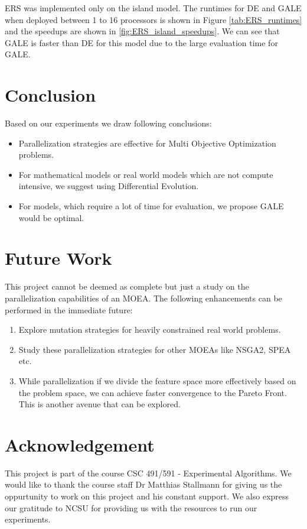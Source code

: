 \documentclass[conference]{IEEEtran}
\begin{document}
	
	
	
	ERS was implemented only on the island model. The runtimes for DE and GALE when deployed between 1 to 16 processors is shown in Figure \ref{tab:ERS_runtimes} and the speedups are shown in \ref{fig:ERS_island_speedups}. We can see that GALE is faster than DE for this model due to the large evaluation time for GALE.
	
	\section{Conclusion}
	\label{conclusion}
	Based on our experiments we draw following conclusions:
	\begin{itemize}
	\item Parallelization strategies are effective for Multi Objective Optimization problems.
	\item For mathematical models or real world models which are not compute intensive, we suggest using Differential Evolution.
	\item For models, which require a lot of time for evaluation, we propose GALE would be optimal.
	\end{itemize}
	
	\section{Future Work}
	\label{future}
	
	This project cannot be deemed as complete but just a study on the parallelization capabilities of an MOEA. The following enhancements can be performed in the immediate future:
	\begin{enumerate}
		\item Explore mutation strategies for heavily constrained real world problems.
		\item Study these parallelization strategies for other MOEAs like NSGA2, SPEA etc.
	    \item While parallelization if we divide the feature space more effectively based on the problem space, we can achieve faster convergence to the Pareto Front. This is another avenue that can be explored.
	\end{enumerate}

    \section{Acknowledgement}
    \label{acknowledgement}
    This project is part of the course CSC 491/591 - Experimental Algorithms. We would like to thank the course staff Dr Matthias Stallmann for giving us the oppurtunity to work on this project and his constant support. We also express our gratitude to NCSU for providing us with the resources to run our experiments.
    
	
	
\end{document}
